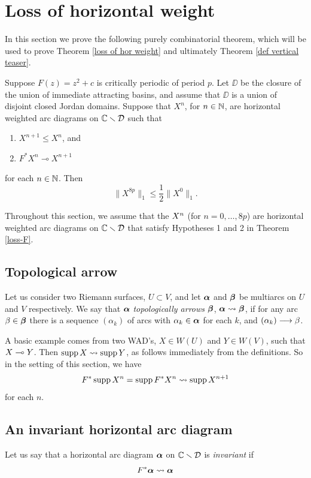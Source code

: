 \section{Loss of horizontal weight} \label{sec:entropy} \label{sec:loss-hor}
In this section we prove the following purely combinatorial theorem,
which will be used to prove Theorem \ref{loss of hor weight} and ultimately Theorem \ref{def vertical teaser}. 
\begin{theorem}\label{loss-F}
Suppose $F(z) = z^2 + c$ is critically periodic of period $p$.
Let $\DD$ be the closure of the union of immediate attracting basins, and assume that $\DD$ is a union of disjoint closed Jordan domains.
Suppose that $X^n$, for $n \in {\Bbb N}$, are horizontal weighted arc diagrams on ${\Bbb C} \smallsetminus {\mathcal D}$ such that
\begin{enumerate}
\item
$X^{n+1} \le X^n$, and 
\item
$F^*X^n \multimap X^{n+1}$
\end{enumerate}
for each $n \in {\Bbb N}$. 
Then
$$
     \| X^{8p}\|_1\leq \frac{1}{2} \| X^0 \|_1.
$$
\end{theorem}


Throughout this section,
we assume that the $X^{n}$ (for $n = 0, \ldots, 8p$) are  horizontal weighted arc diagrams on ${\Bbb C} \smallsetminus {\mathcal D}$
that satisfy Hypotheses 1 and 2 in Theorem \ref{loss-F}.

\subsection{Topological arrow}
  Let us consider two Riemann surfaces, $U\subset V$,
and let ${\mbox{\boldmath$\alpha$} }$ and ${\mbox{\boldmath$\beta$} }$ be multiarcs on $U$ and $V$  respectively.
We say that ${\mbox{\boldmath$\alpha$} }$ {\it topologically arrows} ${\mbox{\boldmath$\beta$} }$, ${\mbox{\boldmath$\alpha$} }\leadsto{\mbox{\boldmath$\beta$} }$,
if for any arc $\beta\in {\mbox{\boldmath$\beta$} }$
there is a sequence $(\alpha_k)$ of arcs
 with $\alpha_k \in {\mbox{\boldmath$\alpha$} }$ for each $k$,
and $(\alpha_k) \longrightarrow \beta$.

A basic example comes from two WAD's, $X\in W(U)$ and $Y\in W(V)$,
such that $X\multimap Y$. Then  $\operatorname{supp} X \leadsto \operatorname{supp} Y$,
as follows immediately from the definitions.
So in the setting of this section, we have $$F^*\operatorname{supp} X^{n} = \operatorname{supp} F^*X^{n} \leadsto \operatorname{supp} X^{n+1}$$ for each $n$. 

\subsection{An invariant horizontal arc diagram}


Let us say that a horizontal arc diagram ${\mbox{\boldmath$\alpha$} }$ on  ${\Bbb C}\smallsetminus {\mathcal D}$ is {\it invariant} if
$$
   F^*{\mbox{\boldmath$\alpha$} } \leadsto {\mbox{\boldmath$\alpha$} } $$

